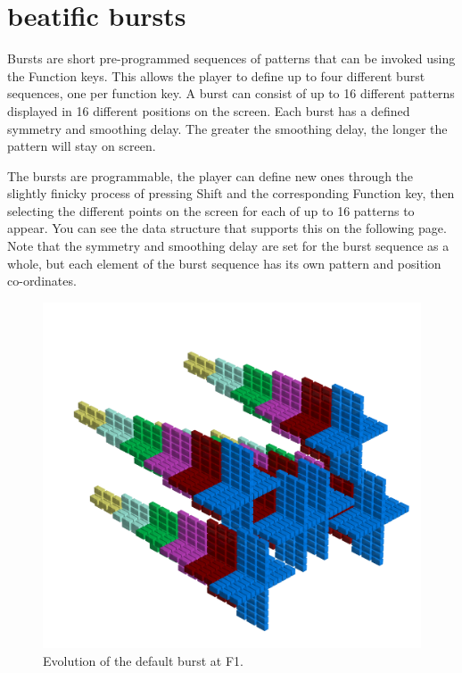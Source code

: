\chapter{beatific bursts} 
\label{sec:bursts}
\lstset{style=6502Style}
Bursts are short pre-programmed sequences of patterns that can be invoked using the Function keys.
This allows the player to define up to four different burst sequences, one per function key. A burst
can consist of up to 16 different patterns displayed in 16 different positions on the screen. Each burst
has a defined symmetry and smoothing delay. The greater the smoothing delay, the longer the pattern
will stay on screen.

The bursts are programmable, the player can define new ones through the slightly finicky process of pressing
Shift and the corresponding Function key, then selecting the different points on the screen for each of up
to 16 patterns to appear. You can see the data structure that supports this on the following page. Note
that the symmetry and smoothing delay are set for the burst sequence as a whole, but each element of the
burst sequence has its own pattern and position co-ordinates.

\clearpage
\begin{figure}[H]
    \centering
    \begin{adjustbox}{width=12cm,center}
      \includegraphics[width=12cm]{src/patterns/bursts/pattern0-45.png}%
    \end{adjustbox}
\caption{Evolution of the default burst at F1.}
\end{figure}
\clearpage

